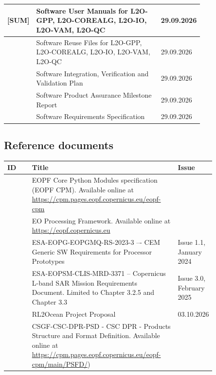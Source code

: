 \begin{xltabular}{\textwidth}{|l|p{0.65\linewidth}|p{0.15\linewidth}|}
    [SUM] & Software User Manuals for L2O-GPP, L2O-COREALG, L2O-IO, L2O-VAM, L2O-QC & 29.09.2026 \\ \hline
    [SRF] & Software Reuse Files for L2O-GPP, L2O-COREALG, L2O-IO, L2O-VAM, L2O-QC & 29.09.2026 \\ \hline
    [SIVVP] & Software Integration, Verification and Validation Plan & 29.09.2026 \\ \hline
    [SPAMR] & Software Product Assurance Milestone Report & 29.09.2026 \\ \hline
    [SRS] & Software Requirements Specification  & 29.09.2026 \\ \hline
\end{xltabular}

\subsection{Reference documents}
\label{sec:ref-doc}

\begin{xltabular}{\textwidth}{|l|p{0.7\linewidth}|p{0.15\linewidth}|}\hline
    ID & Title & Issue \\ \hline\hline
    [CPM] & EOPF Core Python Modules specification (EOPF CPM). Available online at
\url{https://cpm.pages.eopf.copernicus.eu/eopf-cpm} & \\ \hline
    [EOPF] & EO Processing Framework. Available online at \url{https://eopf.copernicus.eu} & \\ \hline
    [GEN]&  ESA-EOPG-EOPGMQ-RS-2023-3 –- CEM Generic SW Requirements for Processor Prototypes &
Issue 1.1, January 2024 \\\hline
    [MRD] & ESA-EOPSM-CLIS-MRD-3371 -- Copernicus L-band SAR Mission Requirements Document. Limited to Chapter 3.2.5 and Chapter 3.3 & Issue
3.0, February 2025\\ \hline
    [PP] & RL2Ocean Project Proposal & 03.10.2026 \\ \hline
    [PSFD] & CSGF-CSC-DPR-PSD - CSC DPR - Products Structure and Format Definition. Available online at
\url{https://cpm.pages.eopf.copernicus.eu/eopf-cpm/main/PSFD/}) & \\ \hline
\end{xltabular}
